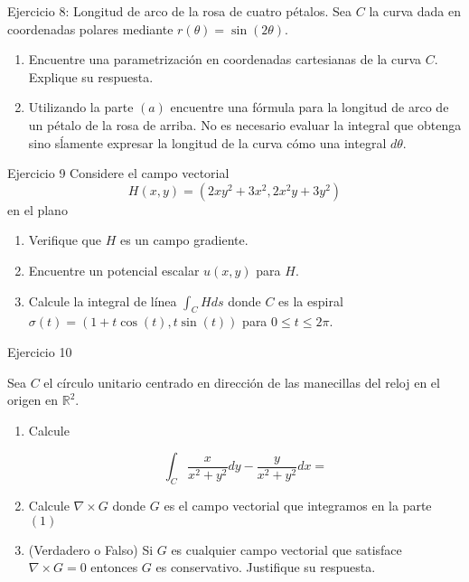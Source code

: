 \documentclass[usepdftitle=false]{beamer}
\begin{document}
\begin{frame}{Ejercicio 8: Longitud de arco de la rosa de cuatro p\'etalos.}
Sea $C$ la curva dada en coordenadas polares mediante $r(\theta)=\sin(2\theta)$.

\begin{enumerate}
\item Encuentre una parametrizaci\'on en coordenadas cartesianas de la curva $C$. Explique su respuesta.

\item Utilizando la parte $(a)$ encuentre una f\'ormula para la longitud de arco de un p\'etalo de la  rosa de arriba. No es necesario evaluar la integral que obtenga sino s\'lamente expresar la longitud de la curva c\'omo una integral $d\theta$.
\end{enumerate}

 
\end{frame}


\begin{frame}{Ejercicio 9}
Considere el campo vectorial \[H(x,y)=(2xy^2+3x^2, 2x^2y+3y^2)\]
en el plano

\begin{enumerate}
\item Verifique que $H$ es un campo gradiente.
\item Encuentre un potencial escalar $u(x,y)$ para $H$.
\item Calcule la integral de l\'inea $\int_C H ds$
donde $C$ es la espiral $\sigma(t)=(1+ t\cos(t), t\sin(t))$ para $0\leq t\leq 2\pi$. 
\end{enumerate}

\end{frame}

\begin{frame}{Ejercicio 10}

Sea $C$ el c\'irculo unitario centrado en direcci\'on de las manecillas del reloj en el origen en $\mathbb{R}^2$. 

\begin{enumerate}
\item Calcule 

\[\int_C \frac{x}{x^2+y^2}dy-\frac{y}{x^2+y^2}dx=\] 

\item Calcule $\nabla\times G$ donde $G$ es el campo vectorial que integramos en la parte $(1)$

\item (Verdadero o Falso) Si $G$ es cualquier campo vectorial que satisface $\nabla\times G=0$ entonces $G$ es conservativo. Justifique su respuesta.

\end{enumerate}


\end{frame}
\end{document}
